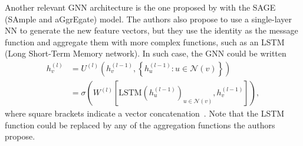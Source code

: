 Another relevant GNN architecture is the one proposed by  with the SAGE (SAmple and aGgrEgate) model.
The authors also propose to use a single-layer NN to generate the new feature vectors, but they use the identity as the message function and aggregate them with more complex functions, such as an LSTM (Long Short-Term Memory network).
In such case, the GNN could be written
\begin{equation}\label{eq:graph-sage}
\begin{aligned}
    h^{(l)}_v &= U^{(l)}\left( h^{(l-1)}_v, \left\{ h^{(l-1)}_u:u\in \mathcal{N}(v) \right\}  \right)  \\
    &= \sigma\left( W^{(l)} \left[ \text{LSTM}\left( h^{(l-1)}_u \right)_{u\in \mathcal{N}(v)} , h^{(l-1)}_v \right]   \right)
,\end{aligned}
\end{equation}
where square brackets indicate a vector concatenation~\cite{sanchez-lengelingGentleIntroductionGraph2021}.
Note that the LSTM function could be replaced by any of the aggregation functions the authors propose.



